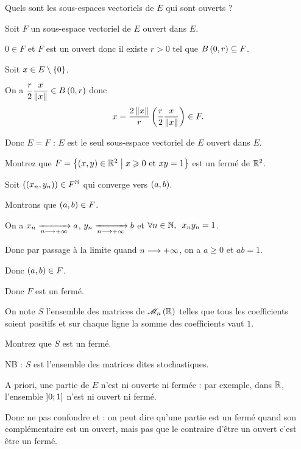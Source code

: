 \begin{exo}
Quels sont les sous-espaces vectoriels de \(E\) qui sont ouverts ?
\end{exo}

\begin{corr}
Soit \(F\) un sous-espace vectoriel de \(E\) ouvert dans \(E\).

\(0\in F\) et \(F\) est un ouvert donc il existe \(r>0\) tel que \(\bouleo{0}{r}\subset F\).

Soit \(x\in E\setminus\left\lbrace0\right\rbrace\).

On a \(\dfrac{r}{2}\dfrac{x}{\norme{x}}\in\bouleo{0}{r}\) donc \[x=\dfrac{2\norme{x}}{r}\paren{\dfrac{r}{2}\dfrac{x}{\norme{x}}}\in F.\]

Donc \(E=F\) : \(E\) est le seul sous-espace vectoriel de \(E\) ouvert dans \(E\).
\end{corr}

\begin{exo}
Montrez que \(F=\left\lbrace\left(x,y\right)\in\mathbb{R}^2\;\middle|\; x\geqslant0\text{ et }xy=1\right\rbrace\) est un fermé de \(\mathbb{R}^2\).
\end{exo}

\begin{corr}
Soit \(\left(\left(x_n,y_n\right)\right)\in F^{\mathbb{N}}\) qui converge vers \(\left(a,b\right)\).

Montrons que \(\left(a,b\right)\in F\).

On a \(x_n\xrightarrow[n\longrightarrow+\infty]{}a\), \(y_n\xrightarrow[n\longrightarrow+\infty]{}b\) et \(\quantifs{\forall n\in\N}x_ny_n=1\).

Donc par passage à la limite quand \(n\longrightarrow+\infty\), on a \(a\geq0\) et \(ab=1\).

Donc \(\left(a,b\right)\in F\).

Donc \(F\) est un fermé.
\end{corr}

\begin{exo}
On note \(S\) l'ensemble des matrices de \(\M{n}[\R]\) telles que tous les coefficients soient positifs et sur chaque ligne la somme des coefficients vaut \(1\).

Montrez que \(S\) est un fermé.

NB : \(S\) est l'ensemble des matrices dites stochastiques.
\end{exo}

\begin{rem}
A priori, une partie de \(E\) n'est ni ouverte ni fermée : par exemple, dans \(\mathbb{R}\), l'ensemble \(\left]0;1\right]\) n'est ni ouvert ni fermé.

Donc ne pas confondre  et  : on peut dire qu'une partie est un fermé quand son complémentaire est un ouvert, mais pas que le contraire d'être un ouvert c'est être un fermé.
\end{rem}

